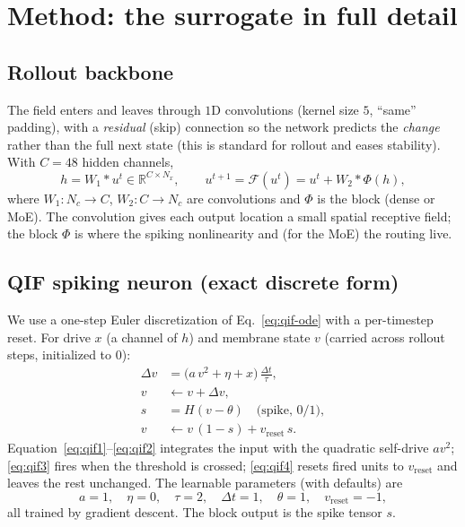 \documentclass[11pt]{article}
\begin{document}
\section{Method: the surrogate in full detail}\label{sec:method}

\subsection{Rollout backbone}
The field enters and leaves through $1$D convolutions (kernel size $5$, ``same'' padding), with a
\emph{residual} (skip) connection so the network predicts the \emph{change} rather than the full next
state (this is standard for rollout and eases stability). With $C{=}48$ hidden channels,
\begin{equation}
h = W_1 \ast u^t \in \mathbb{R}^{C\times N_x},\qquad
u^{t+1} = \mathcal{F}(u^t) = u^t + W_2 \ast \Phi(h),
\end{equation}
where $W_1:N_c\!\to\!C$, $W_2:C\!\to\!N_c$ are convolutions and $\Phi$ is the block (dense or MoE).
The convolution gives each output location a small spatial receptive field; the block $\Phi$ is where
the spiking nonlinearity and (for the MoE) the routing live.

\subsection{QIF spiking neuron (exact discrete form)}\label{sec:qif}
We use a one-step Euler discretization of Eq.~\eqref{eq:qif-ode} with a per-timestep reset. For drive
$x$ (a channel of $h$) and membrane state $v$ (carried across rollout steps, initialized to $0$):
\begin{align}
\Delta v &= \big(a\,v^2 + \eta + x\big)\,\frac{\Delta t}{\tau}, \label{eq:qif1}\\
v &\leftarrow v + \Delta v, \label{eq:qif2}\\
s &= H(v-\theta) \quad\text{(spike, $0/1$)}, \label{eq:qif3}\\
v &\leftarrow v\,(1-s) + v_{\mathrm{reset}}\,s. \label{eq:qif4}
\end{align}
Equation~\eqref{eq:qif1}--\eqref{eq:qif2} integrates the input with the quadratic self-drive
$a v^2$; \eqref{eq:qif3} fires when the threshold is crossed; \eqref{eq:qif4} resets fired units to
$v_{\mathrm{reset}}$ and leaves the rest unchanged. The learnable parameters (with defaults) are
\[
a=1,\quad \eta=0,\quad \tau=2,\quad \Delta t=1,\quad \theta=1,\quad v_{\mathrm{reset}}=-1,
\]
all trained by gradient descent. The block output is the spike tensor $s$.
\end{document}
